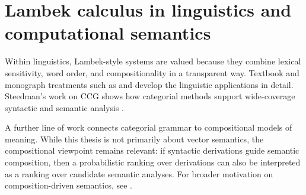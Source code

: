 \section{Lambek calculus in linguistics and computational semantics}
Within linguistics, Lambek-style systems are valued because they combine lexical sensitivity,
word order, and compositionality in a transparent way. Textbook and monograph treatments
such as \citet{Morrill1994} and \citet{Moortgat1997} develop the linguistic applications in detail.
Steedman's work on CCG shows how categorial methods support wide-coverage syntactic and
semantic analysis \citep{Steedman2000}.

A further line of work connects categorial grammar to compositional models of meaning. While
this thesis is not primarily about vector semantics, the compositional viewpoint remains relevant:
if syntactic derivations guide semantic composition, then a probabilistic ranking over derivations
can also be interpreted as a ranking over candidate semantic analyses. For broader motivation on
composition-driven semantics, see \citet{CoeckeSadrzadehClark2010}.

